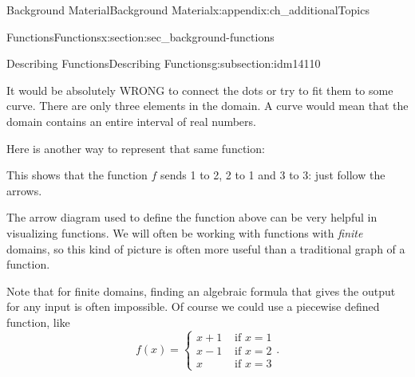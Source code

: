\documentclass[oneside,10pt,]{book}
\numberwithin{equation}{chapter}
\newcommand{\amp}{&}
\begin{document}
\begin{appendixptx}{Background Material}{}{Background Material}{}{}{x:appendix:ch_additionalTopics}
\begin{sectionptx}{Functions}{}{Functions}{}{}{x:section:sec_background-functions}
\begin{subsectionptx}{Describing Functions}{}{Describing Functions}{}{}{g:subsection:idm14110}
\begin{sidebyside}{1}{0.35}{0.35}{0}%
\begin{sbspanel}{0.3}%
%
\end{sbspanel}%
\end{sidebyside}%
\par
It would be absolutely WRONG to connect the dots or try to fit them to some curve. There are only three elements in the domain. A curve would mean that the domain contains an entire interval of real numbers.%
\par
Here is another way to represent that same function:%
\begin{sidebyside}{1}{0.415}{0.415}{0}%
\begin{sbspanel}{0.17}%
%
\end{sbspanel}%
\end{sidebyside}%
\par
This shows that the function \(f\) sends 1 to 2, 2 to 1 and 3 to 3: just follow the arrows.%
\par
The arrow diagram used to define the function above can be very helpful in visualizing functions. We will often be working with functions with \emph{finite} domains, so this kind of picture is often more useful than a traditional graph of a function.%
\par
Note that for finite domains, finding an algebraic formula that gives the output for any input is often impossible.  Of course we could use a piecewise defined function, like%
\begin{equation*}
f(x) = \begin{cases} x+1 \amp \text{ if } x = 1 \\ x-1 \amp \text{ if } x = 2 \\ x \amp \text{ if } x = 3\end{cases}.
\end{equation*}

\end{subsectionptx}
\end{sectionptx}
\end{appendixptx}
\end{document}
